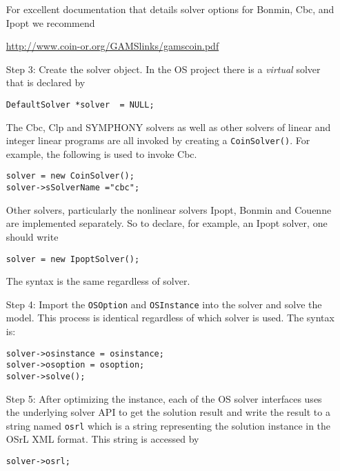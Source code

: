\documentclass[11pt]{article}
\renewcommand{\{}{{\char"7B}}
\renewcommand{\}}{{\char"7D}}
\renewcommand{\^}{{\char"0D}}
\renewcommand{\'}{{\char"0D}}
\begin{document}
\begin{itemize}
For excellent documentation that details solver options for Bonmin, Cbc, and Ipopt 
we recommend 

\begin{center}
\url{http://www.coin-or.org/GAMSlinks/gamscoin.pdf}
\end{center}


\item[Step 3:] Create the solver object. In the OS project there is a {\it virtual} solver that 
is declared by

\begin{verbatim}
DefaultSolver *solver  = NULL;
\end{verbatim}

The Cbc, Clp and SYMPHONY solvers as well as other solvers of linear and integer linear programs
are all invoked by creating a {\tt CoinSolver()}. For example, the following is used to invoke Cbc.

\begin{verbatim}
solver = new CoinSolver();
solver->sSolverName ="cbc";
\end{verbatim}

Other solvers, particularly the nonlinear solvers Ipopt, Bonmin and Couenne 
are implemented separately. So to declare, for example, an Ipopt solver, one should write

\begin{verbatim}
solver = new IpoptSolver();
\end{verbatim}

The syntax is the same regardless of solver. 

\item[Step 4:] Import the {\tt OSOption} and {\tt OSInstance} into the solver and solve the model. 
This process is identical regardless of which solver is used. The syntax is:

\begin{verbatim}
solver->osinstance = osinstance;
solver->osoption = osoption;	
solver->solve();
\end{verbatim}

\item[Step 5:] After optimizing the instance,  each of the OS solver interfaces uses 
the underlying solver API to get the solution result and write the result to a string 
named {\tt osrl} which is a string representing the solution instance in the OSrL XML format.  
This string is accessed by

\begin{verbatim}
solver->osrl;
\end{verbatim}



\end{itemize}
\end{document}
